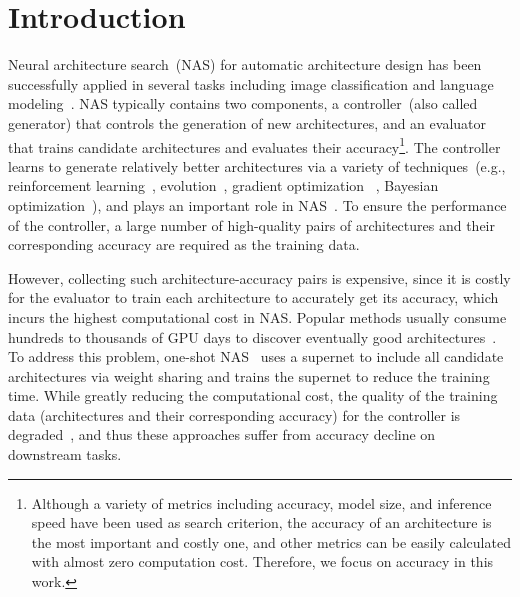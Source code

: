 \documentclass{article}
\begin{document}
\section{Introduction}
\label{intro}
Neural architecture search~(NAS) for automatic architecture design has been successfully applied in several tasks including image classification and language modeling~\cite{nasnet,evovledtransformer,nasfpn}. NAS typically contains two components, a controller~(also called generator) that controls the generation of new architectures, and an evaluator that trains candidate architectures and evaluates their accuracy\footnote{Although a variety of metrics including accuracy, model size, and inference speed have been used as search criterion, the accuracy of an architecture is the most important and costly one, and other metrics can be easily calculated with almost zero computation cost. Therefore, we focus on accuracy in this work.}. The controller learns to generate relatively better architectures via a variety of techniques~(e.g., reinforcement learning~\cite{nas,nasnet}, evolution~\cite{amoebanet}, gradient optimization ~\cite{darts,nao}, Bayesian optimization~\cite{bayesnas}), and plays an important role in NAS~\cite{nas,nasnet,enas,amoebanet,nao,darts,bayesnas}. To ensure the performance of the controller, a large number of high-quality pairs of architectures and their corresponding accuracy are required as the training data.

However, collecting such architecture-accuracy pairs is expensive, since it is costly for the evaluator to train each architecture to accurately get its accuracy, which incurs the highest computational cost in NAS. Popular methods usually consume hundreds to thousands of GPU days to discover eventually good architectures~\cite{nas,amoebanet,nao}. To address this problem, one-shot NAS~\cite{oneshot,enas,darts,snas} uses a supernet to include all candidate architectures via weight sharing and trains the supernet to reduce the training time. While greatly reducing the computational cost, the quality of the training data (architectures and their corresponding accuracy) for the controller is degraded~\cite{searchphasenas}, and thus these approaches suffer from accuracy decline on downstream tasks. 
\end{document}
